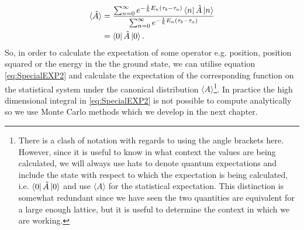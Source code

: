\documentclass[12pt]{article}
\begin{document}
        \begin{align}
            \braket{\hat{A}} & = \frac{\sum_{n=0}^{\infty}e^{-\frac{1}{\hbar}E_n\left(\tau_b-\tau_a\right)}\bra{n}\hat{A}\ket{n}}{\sum_{n=0}^{\infty}e^{-\frac{1}{\hbar}E_n\left(\tau_b-\tau_a\right)}} \\
            & = \bra{0}\hat{A}\ket{0}.
        \end{align}
        So, in order to calculate the expectation of some operator e.g. position, position squared or the energy in the the ground state, we can utilise equation \ref{eq:SpecialEXP2} and calculate the expectation of the corresponding function on the statistical system under the canonical distribution $\langle A \rangle$\footnote{There is a clash of notation with regards to using the angle brackets here. However, since it is useful to know in what context the values are being calculated, we will always use hats to denote quantum expectations and include the state with respect to which the expectation is being calculated, i.e. $\bra{0}\hat{A}\ket{0}$ and use $\langle A \rangle$ for the statistical expectation. This distinction is somewhat redundant since we have seen the two quantities are equivalent for a large enough lattice, but it is useful to determine the context in which we are working.}. In practice the high dimensional integral in \ref{eq:SpecialEXP2} is not possible to compute analytically so we use Monte Carlo methods which we develop in the next chapter.
\end{document}

